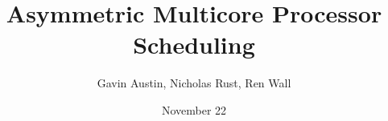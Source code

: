 \documentclass[12pt]{article}
\title{Asymmetric Multicore Processor Scheduling}
\author{Gavin Austin, Nicholas Rust, Ren Wall}
\date{November 22}
\begin{document}
\maketitle

	
	
	
	
	
	
	
	
	
	
\newpage
{}

\end{document}
